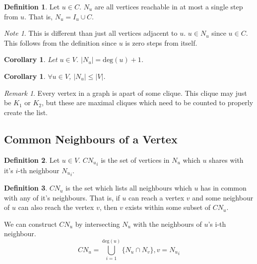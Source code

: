 \documentclass{article}
\theoremstyle{plain}
\newtheorem{cor}[thm]{Corollary}
\theoremstyle{definition}
\newtheorem{defn}{Definition}[]
\theoremstyle{remark}
\newtheorem*{rem}{Remark}
\newtheorem*{note}{Note}
\newcommand{\cn}[1]{ {{CN}_{#1}} }
\newcommand{\vdeg}[1]{ {\text{deg}({#1})} }
\newcommand{\ignv}[1]{ {I_{#1}} }
\newcommand{\nev}[1]{ {N_{#1}} }
\begin{document}
\begin{defn}
    Let \(u \in C\). \(\nev{u}\) are all vertices reachable in at most a single step from
    \(u\). That is, \(\nev{u} = \ignv{u} \cup C\).
    \begin{note}
        This is different than just all vertices adjacent to \(u\). \(u \in \nev{u}\)
        since \(u \in C\). This follows from the definition since \(u\) is zero steps from
        itself.
    \end{note}
\end{defn}

\begin{cor}
    Let \(u \in V\). \(|\nev{u}| = \vdeg{u} + 1\).
\end{cor}

\begin{cor}
    \(\forall u \in V\), \(|\nev{u}| \leq |V|\). \label{neighbour_size}
\end{cor}

\begin{rem}
    Every vertex in a graph is apart of some clique. This clique may just be \(K_1\) or
    \(K_2\), but these are maximal cliques which need to be counted to properly create the
    list.
\end{rem}

\subsection{Common Neighbours of a Vertex}

\begin{defn}
    Let \(u \in V\). \(\cn{u}_i\) is the set of vertices in \(\nev{u}\) which \(u\) shares
    with it's \(i\)-th neighbour \(\nev{u}_i\).
\end{defn}

\begin{defn}
    \(\cn{u}\) is the set which lists all neighbours which \(u\) has in common with any of
    it's neighbours. That is, if \(u\) can reach a vertex \(v\) and some neighbour of
    \(u\) can also reach the vertex \(v\), then \(v\) exists within some subset of
    \(\cn{u}\).
\end{defn}

We can construct \(\cn{u}\) by intersecting \(\nev{u}\) with the neighbours of \(u\)'s
i-th neighbour.
\begin{equation}
    \cn{u} = \bigcup_{i=1}^{\vdeg{u}} \{ \nev{u} \cap \nev{v} \}, v = {\nev{u}}_i
    \label{cn_construct}
\end{equation}
\end{document}
